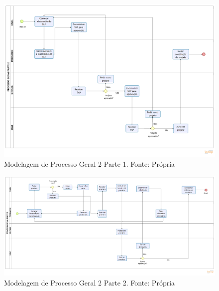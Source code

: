 \begin{landscape}
    \begin{figure}[H]
        \centering
        \includegraphics[width=1.2\textwidth]{figuras/processoGeralParte21.png}
        \caption{Modelagem de Processo Geral 2 Parte 1. Fonte: Própria}
        \label{img:modelagemProcessoGeral2Parte1}
    \end{figure}
\end{landscape}

\begin{landscape}
    \begin{figure}[H]
        \centering
        \includegraphics[width=1.3\textwidth]{figuras/processoGeralParte22.png}
        \caption{Modelagem de Processo Geral 2 Parte 2. Fonte: Própria}
        \label{img:modelagemProcessoGeral2Parte2}
    \end{figure}
\end{landscape}